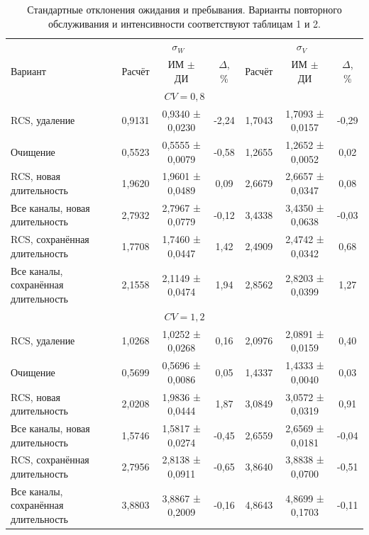 \begin{table}[!htbp]
\centering\small\setlength{\tabcolsep}{3pt}
\begin{tabular}{@{}p{4.2cm}cccccc@{}}
\toprule
 & \multicolumn{3}{c}{$\sigma_W$} & \multicolumn{3}{c}{$\sigma_V$} \\
Вариант & Расчёт & ИМ $\pm$ ДИ & $\Delta$, \% & Расчёт & ИМ $\pm$ ДИ & $\Delta$, \% \\
\midrule
\multicolumn{7}{c}{$CV=0,8$} \\
RCS, удаление & 0,9131 & 0,9340 ± 0,0230 & -2,24 & 1,7043 & 1,7093 ± 0,0157 & -0,29 \\
Очищение & 0,5523 & 0,5555 ± 0,0079 & -0,58 & 1,2655 & 1,2652 ± 0,0052 & 0,02 \\
RCS, новая длительность & 1,9620 & 1,9601 ± 0,0489 & 0,09 & 2,6679 & 2,6657 ± 0,0347 & 0,08 \\
Все каналы, новая длительность & 2,7932 & 2,7967 ± 0,0779 & -0,12 & 3,4338 & 3,4350 ± 0,0638 & -0,03 \\
RCS, сохранённая длительность & 1,7708 & 1,7460 ± 0,0447 & 1,42 & 2,4909 & 2,4742 ± 0,0342 & 0,68 \\
Все каналы, сохранённая длительность & 2,1558 & 2,1149 ± 0,0474 & 1,94 & 2,8562 & 2,8203 ± 0,0399 & 1,27 \\
\multicolumn{7}{c}{$CV=1,2$} \\
RCS, удаление & 1,0268 & 1,0252 ± 0,0268 & 0,16 & 2,0976 & 2,0891 ± 0,0159 & 0,40 \\
Очищение & 0,5699 & 0,5696 ± 0,0086 & 0,05 & 1,4337 & 1,4333 ± 0,0040 & 0,03 \\
RCS, новая длительность & 2,0208 & 1,9836 ± 0,0444 & 1,87 & 3,0849 & 3,0572 ± 0,0319 & 0,91 \\
Все каналы, новая длительность & 1,5746 & 1,5817 ± 0,0274 & -0,45 & 2,6559 & 2,6569 ± 0,0181 & -0,04 \\
RCS, сохранённая длительность & 2,7956 & 2,8138 ± 0,0911 & -0,65 & 3,8640 & 3,8838 ± 0,0700 & -0,51 \\
Все каналы, сохранённая длительность & 3,8803 & 3,8867 ± 0,2009 & -0,16 & 4,8643 & 4,8699 ± 0,1703 & -0,11 \\
\bottomrule
\end{tabular}
\caption{Стандартные отклонения ожидания и пребывания. Варианты повторного обслуживания и интенсивности соответствуют таблицам 1 и 2.}
\label{tab:sko}
\end{table}
